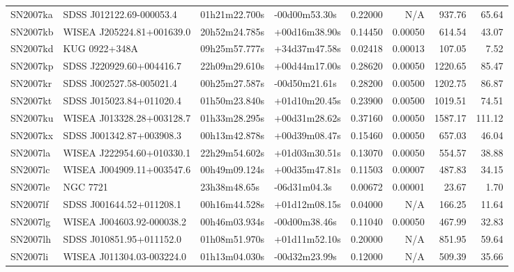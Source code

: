\begin{longtable}{llllrrrr}
SN2007ka         &        SDSS J012122.69-000053.4 &   01h21m22.700s &   -00d00m53.30s &  0.22000 &      N/A &   937.76 &       65.64 \\
SN2007kb         &       WISEA J205224.81+001639.0 &   20h52m24.785s &   +00d16m38.90s &  0.14450 &  0.00050 &   614.54 &       43.07 \\
SN2007kd         &                   KUG 0922+348A &   09h25m57.777s &   +34d37m47.58s &  0.02418 &  0.00013 &   107.05 &        7.52 \\
SN2007kp         &        SDSS J220929.60+004416.7 &   22h09m29.610s &   +00d44m17.00s &  0.28620 &  0.00050 &  1220.65 &       85.47 \\
SN2007kr         &        SDSS J002527.58-005021.4 &   00h25m27.587s &   -00d50m21.61s &  0.28200 &  0.00500 &  1202.75 &       86.87 \\
SN2007kt         &        SDSS J015023.84+011020.4 &   01h50m23.840s &   +01d10m20.45s &  0.23900 &  0.00500 &  1019.51 &       74.51 \\
SN2007ku         &       WISEA J013328.28+003128.7 &   01h33m28.295s &   +00d31m28.62s &  0.37160 &  0.00050 &  1587.17 &      111.12 \\
SN2007kx         &        SDSS J001342.87+003908.3 &   00h13m42.878s &   +00d39m08.47s &  0.15460 &  0.00050 &   657.03 &       46.04 \\
SN2007la         &       WISEA J222954.60+010330.1 &   22h29m54.602s &   +01d03m30.51s &  0.13070 &  0.00050 &   554.57 &       38.88 \\
SN2007lc         &       WISEA J004909.11+003547.6 &   00h49m09.124s &   +00d35m47.81s &  0.11503 &  0.00007 &   487.83 &       34.15 \\
SN2007le         &                        NGC 7721 &    23h38m48.65s &    -06d31m04.3s &  0.00672 &  0.00001 &    23.67 &        1.70 \\
SN2007lf         &        SDSS J001644.52+011208.1 &   00h16m44.528s &   +01d12m08.15s &  0.04000 &      N/A &   166.25 &       11.64 \\
SN2007lg         &       WISEA J004603.92-000038.2 &   00h46m03.934s &   -00d00m38.46s &  0.11040 &  0.00050 &   467.99 &       32.83 \\
SN2007lh         &        SDSS J010851.95+011152.0 &   01h08m51.970s &   +01d11m52.10s &  0.20000 &      N/A &   851.95 &       59.64 \\
SN2007li         &       WISEA J011304.03-003224.0 &   01h13m04.030s &   -00d32m23.99s &  0.12000 &      N/A &   509.39 &       35.66 \\

\end{longtable}
